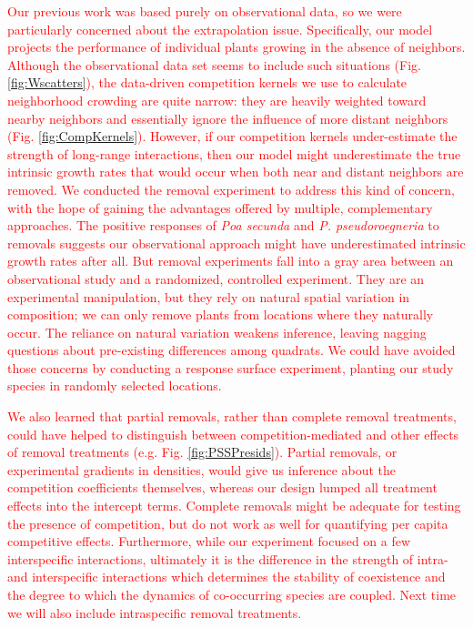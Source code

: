\documentclass[11pt]{article}
\newcommand{\new}{\textcolor{red}}
\begin{document}
\begin{doublespacing}
\new{Our previous work was based purely on observational data, so we were particularly concerned about the extrapolation issue.
Specifically, our model projects the performance of individual plants growing in the absence of neighbors. Although the observational data set seems to include such situations (Fig. \ref{fig:Wscatters}), the data-driven competition kernels we use to calculate neighborhood crowding are quite narrow: they are heavily weighted toward nearby neighbors and essentially ignore the influence of more distant neighbors (Fig. \ref{fig:CompKernels}). However, if our competition kernels under-estimate the strength of long-range interactions, then our model might underestimate the true intrinsic growth rates that would occur when both near and distant neighbors are removed. We conducted the removal experiment to address this kind of concern, with the hope of gaining the advantages offered by multiple, complementary approaches. The positive responses of \textit{Poa secunda} and \textit{P. pseudoroegneria} to removals suggests our observational approach might have underestimated intrinsic growth rates after all. But removal experiments fall into a gray area between an observational study and a randomized, controlled experiment. They are an experimental manipulation, but they rely on natural spatial variation in composition; we can only remove plants from locations where they naturally occur. The reliance on natural variation weakens inference, leaving nagging questions about pre-existing differences among quadrats. We could have avoided those concerns by conducting a response surface experiment, planting our study species in randomly selected locations.}

\new{We also learned that partial removals, rather than complete removal treatments, could 
have helped to distinguish between competition-mediated and other effects of removal treatments (e.g. Fig. \ref{fig:PSSPresids}).
Partial removals, or experimental gradients in densities, would give us inference about the competition coefficients themselves, whereas our 
design lumped all treatment effects into the intercept terms. Complete removals might be adequate for testing the presence of competition, but do not work as well for quantifying per capita competitive effects. 
Furthermore, while our experiment focused on a few interspecific interactions, ultimately it is the difference in the strength of intra- and interspecific interactions which determines the stability of coexistence and the degree to which the dynamics of co-occurring species are coupled. Next time we will also include intraspecific removal treatments. }


\end{doublespacing}
\end{document}
